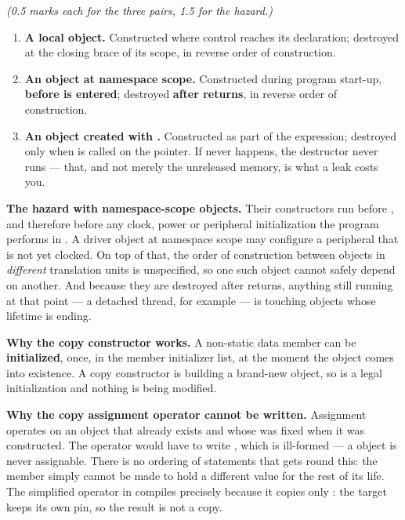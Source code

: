 {\itshape (0.5 marks each for the three pairs, 1.5 for the hazard.)\par}
\begin{enumerate}
  \item \textbf{A local object.} Constructed where control reaches its declaration; destroyed at the
    closing brace of its scope, in reverse order of construction.
  \item \textbf{An object at namespace scope.} Constructed during program start-up,
    \textbf{before  is entered}; destroyed \textbf{after  returns}, in reverse
    order of construction.
  \item \textbf{An object created with .} Constructed as part of the 
    expression; destroyed only when  is called on the pointer. If  never
    happens, the destructor never runs --- that, and not merely the unreleased memory, is what a
    leak costs you.
\end{enumerate}

\textbf{The hazard with namespace-scope objects.} Their constructors run before , and
therefore before any clock, power or peripheral initialization the program performs in .
A driver object at namespace scope may configure a peripheral that is not yet clocked. On top of
that, the order of construction between objects in \emph{different} translation units is
unspecified, so one such object cannot safely depend on another. And because they are destroyed
after  returns, anything still running at that point --- a detached thread, for example
--- is touching objects whose lifetime is ending.


\textbf{Why the copy constructor works.} A  non-static data member can be
\textbf{initialized}, once, in the member initializer list, at the moment the object comes into
existence. A copy constructor is building a brand-new object, so  is a
legal initialization and nothing is being modified. 

\textbf{Why the copy assignment operator cannot be written.} Assignment operates on an object that
already exists and whose  was fixed when it was constructed. The operator would have to
write , which is ill-formed --- a  object is never
assignable. There is no ordering of statements that gets round this: the member simply cannot be
made to hold a different value for the rest of its life. The simplified operator in
 compiles precisely because it copies only : the target keeps its own
pin, so the result is not a copy. 

